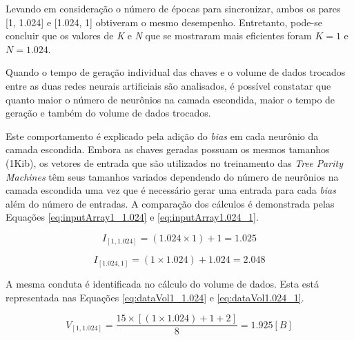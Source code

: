 \documentclass[12pt]{article}
\begin{document}
                Levando em consideração o número de épocas para sincronizar, ambos os pares [1, 1.024] e [1.024, 1] obtiveram o mesmo desempenho. Entretanto, pode-se concluir que os valores de \textit{K} e \textit{N} que se mostraram mais eficientes foram $K = 1$ e $N = 1.024$.
                
                Quando o tempo de geração individual das chaves e o volume de dados trocados entre as duas redes neurais artificiais são analisados, é possível constatar que quanto maior o número de neurônios na camada escondida, maior o tempo de geração e também do volume de dados trocados.
                
                Este comportamento é explicado pela adição do \textit{bias} em cada neurônio da camada escondida. Embora as chaves geradas possuam os mesmos tamanhos (1Kib), os vetores de entrada que são utilizados no treinamento das \textit{Tree Parity Machines} têm seus tamanhos variados dependendo do número de neurônios na camada escondida uma vez que é necessário gerar uma entrada para cada \textit{bias} além do número de entradas. A comparação dos cálculos é demonstrada pelas Equações \eqref{eq:inputArray1_1.024} e \eqref{eq:inputArray1.024_1}.
                
                \begin{equation}
                    \label{eq:inputArray1_1.024}
                    I_{[1, 1.024]} = (1.024 \times 1) + 1 = 1.025
                \end{equation}

                \begin{equation}
                    \label{eq:inputArray1.024_1}
                    I_{[1.024, 1]} = (1 \times 1.024) + 1.024 = 2.048
                \end{equation}
                
                A mesma conduta é identificada no cálculo do volume de dados. Esta está representada nas Equações \eqref{eq:dataVol1_1.024} e \eqref{eq:dataVol1.024_1}.
                
                \begin{equation}
                    \label{eq:dataVol1_1.024}
                    V_{[1, 1.024]} = \frac{15 \times [(1 \times 1.024) + 1 + 2]}{8} = 1.925 [B]
                \end{equation}
\end{document}
